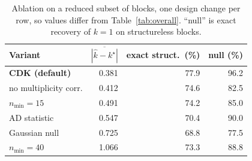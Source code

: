 \begin{table}[!htbp]\centering
\caption{Ablation on a reduced subset of \nNABLB{} blocks, one design change per row, so values differ from Table~\ref{tab:overall}. ``null'' is exact recovery of $k=1$ on structureless blocks.}
\label{tab:ablation}
\begin{tabular}{lrrr}
\toprule
Variant & $\overline{|\hat k-k^\star|}$ & exact struct.\ (\%) & null (\%) \\ \midrule
\textbf{CDK (default)} & 0.381 & 77.9 & 96.2 \\
no multiplicity corr. & 0.412 & 74.6 & 82.5 \\
$n_{\min}=15$ & 0.491 & 74.2 & 85.0 \\
AD statistic & 0.547 & 70.4 & 90.0 \\
Gaussian null & 0.725 & 68.8 & 77.5 \\
$n_{\min}=40$ & 1.066 & 73.3 & 88.8 \\
\bottomrule
\end{tabular}
\end{table}
